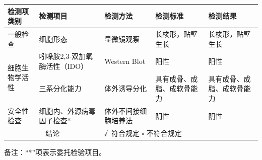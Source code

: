 \documentclass[UTF8,10pt,a4paper,fontset=fandol]{ctexart}
\newcommand{\fieldvalue}[1]{#1}
\newcommand{\handwritten}[1]{#1}
\begin{document}
\small
\begin{tabularx}{\textwidth}{|p{2.1cm}|p{2.5cm}|X|X|X|}
\hline
检测项类别 & 检测项目 & 检测方法 & 检测标准 & 检测结果
\\ \hline
一般检查 &
\fieldvalue{细胞形态}
&
\fieldvalue{显微镜观察}
&
\fieldvalue{长梭形，贴壁生长}
&
\fieldvalue{长梭形，贴壁生长}
\\ \hline
\multirow{2}{*}{细胞生物学活性}
&
\fieldvalue{吲哚胺2,3-双加氧酶活性（IDO）}
&
\fieldvalue{Western Blot}
&
\fieldvalue{阳性}
&
\fieldvalue{阳性}
\\ \cline{2-5}
&
\fieldvalue{三系分化能力}
&
\fieldvalue{体外诱导分化}
&
\fieldvalue{具有成骨、成脂、成软骨能力}
&
\fieldvalue{具有成骨、成脂、成软骨能力}
\\ \hline
安全性检查 &
\fieldvalue{细胞内、外源病毒因子检查*}
&
\fieldvalue{体外不间接细胞培养法}
&
\fieldvalue{阴性}
&
\fieldvalue{阴性}
\\ \hline
\multicolumn{2}{|c|}{结论}
&
\multicolumn{3}{l|}{
\fieldvalue{\handwritten{√\ 符合规定}}
\quad $\square$ 不符合规定
}
\\ \hline
\end{tabularx}
\normalsize

备注：“*”项表示委托检验项目。

\vspace{1.2cm}
\end{document}
